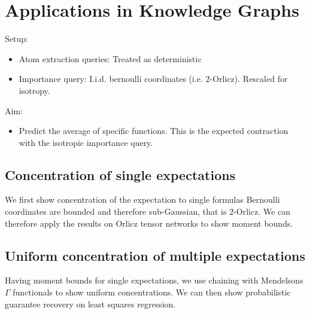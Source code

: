 \section{Applications in Knowledge Graphs}

Setup:
\begin{itemize}
    \item Atom extraction queries: Treated as deterministic
    \item Importance query: I.i.d. bernoulli coordinates (i.e. $2$-Orlicz). Rescaled for isotropy.
\end{itemize}

Aim:
\begin{itemize}
    \item Predict the average of specific functions. This is the expected contraction with the isotropic importance query.
\end{itemize}

\subsection{Concentration of single expectations}

We first show concentration of the expectation to single formulas
Bernoulli coordinates are bounded and therefore sub-Gaussian, that is $2$-Orlicz.
We can therefore apply the results on Orlicz tensor networks to show moment bounds.

\subsection{Uniform concentration of multiple expectations}

Having moment bounds for single expectations, we use chaining with Mendelsons $\Gamma$ functionals to show uniform concentrations.
We can then show probabilistic guarantee recovery on least squares regression.

